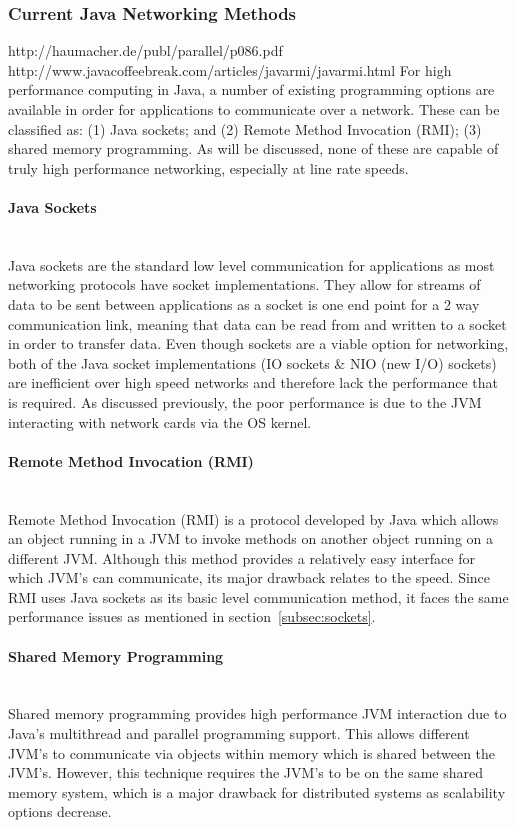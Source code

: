 \documentclass[final_report.tex]{subfiles}
\begin{document}
\subsubsection{Current Java Networking Methods}
http://haumacher.de/publ/parallel/p086.pdf
http://www.javacoffeebreak.com/articles/javarmi/javarmi.html
For high performance computing in Java, a number of existing programming options are available in order for applications to communicate over a network. These can be classified as: (1) Java sockets; and (2) Remote Method Invocation (RMI); (3) shared memory programming. As will be discussed, none of these are capable of truly high performance networking, especially at line rate speeds.

\paragraph{Java Sockets}\mbox{}\\ %
\label{subsec:sockets}
Java sockets are the standard low level communication for applications as most networking protocols have socket implementations. They allow for streams of data to be sent between applications as a socket is one end point for a 2 way communication link, meaning that data can be read from and written to a socket in order to transfer data. Even though sockets are a viable option for networking, both of the Java socket implementations (IO sockets \& NIO (new I/O) sockets) are inefficient over high speed networks \cite{sockets} and therefore lack the performance that is required. As discussed previously, the poor performance is due to the JVM interacting with network cards via the OS kernel.

\paragraph{Remote Method Invocation (RMI)}\mbox{}\\ %
Remote Method Invocation (RMI) is a protocol developed by Java which allows an object running in a JVM to invoke methods on another object running on a different JVM. Although this method provides a relatively easy interface for which JVM's can communicate, its major drawback relates to the speed. Since RMI uses Java sockets as its basic level communication method, it faces the same performance issues as mentioned in section~\ref{subsec:sockets}.

\paragraph{Shared Memory Programming}\mbox{}\\ %
Shared memory programming provides high performance JVM interaction due to Java's multithread and parallel programming support. This allows different JVM's to communicate via objects within memory which is shared between the JVM's. However, this technique requires the JVM's to be on the same shared memory system, which is a major drawback for distributed systems as scalability options decrease.
\end{document}
